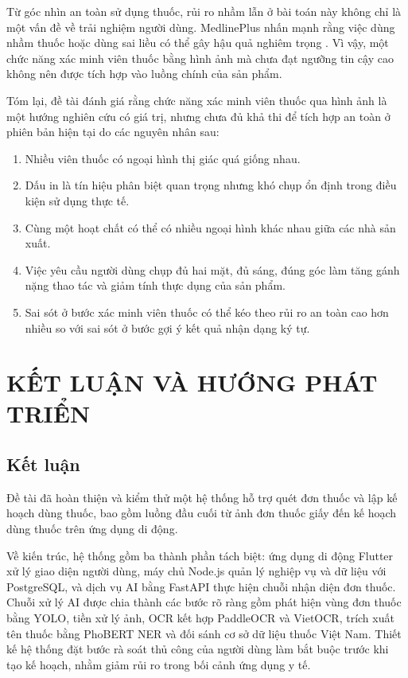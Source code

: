 \documentclass[12pt,a4paper]{report}
\begin{document}
Từ góc nhìn an toàn sử dụng thuốc, rủi ro nhầm lẫn ở bài toán này không chỉ là một vấn đề về trải nghiệm người dùng. MedlinePlus nhấn mạnh rằng việc dùng nhầm thuốc hoặc dùng sai liều có thể gây hậu quả nghiêm trọng \cite{medlineplus-safety}. Vì vậy, một chức năng xác minh viên thuốc bằng hình ảnh mà chưa đạt ngưỡng tin cậy cao không nên được tích hợp vào luồng chính của sản phẩm.

Tóm lại, đề tài đánh giá rằng chức năng xác minh viên thuốc qua hình ảnh là một hướng nghiên cứu có giá trị, nhưng chưa đủ khả thi để tích hợp an toàn ở phiên bản hiện tại do các nguyên nhân sau:

\begin{enumerate}[label=\arabic*.]
    \item Nhiều viên thuốc có ngoại hình thị giác quá giống nhau.
    \item Dấu in là tín hiệu phân biệt quan trọng nhưng khó chụp ổn định trong điều kiện sử dụng thực tế.
    \item Cùng một hoạt chất có thể có nhiều ngoại hình khác nhau giữa các nhà sản xuất.
    \item Việc yêu cầu người dùng chụp đủ hai mặt, đủ sáng, đúng góc làm tăng gánh nặng thao tác và giảm tính thực dụng của sản phẩm.
    \item Sai sót ở bước xác minh viên thuốc có thể kéo theo rủi ro an toàn cao hơn nhiều so với sai sót ở bước gợi ý kết quả nhận dạng ký tự.
\end{enumerate}

\chapter{KẾT LUẬN VÀ HƯỚNG PHÁT TRIỂN}

\section{Kết luận}

Đề tài đã hoàn thiện và kiểm thử một hệ thống hỗ trợ quét đơn thuốc và lập kế hoạch dùng thuốc, bao gồm luồng đầu cuối từ ảnh đơn thuốc giấy đến kế hoạch dùng thuốc trên ứng dụng di động.

Về kiến trúc, hệ thống gồm ba thành phần tách biệt: ứng dụng di động Flutter xử lý giao diện người dùng, máy chủ Node.js quản lý nghiệp vụ và dữ liệu với PostgreSQL, và dịch vụ AI bằng FastAPI thực hiện chuỗi nhận diện đơn thuốc. Chuỗi xử lý AI được chia thành các bước rõ ràng gồm phát hiện vùng đơn thuốc bằng YOLO, tiền xử lý ảnh, OCR kết hợp PaddleOCR và VietOCR, trích xuất tên thuốc bằng PhoBERT NER và đối sánh cơ sở dữ liệu thuốc Việt Nam. Thiết kế hệ thống đặt bước rà soát thủ công của người dùng làm bắt buộc trước khi tạo kế hoạch, nhằm giảm rủi ro trong bối cảnh ứng dụng y tế.
\end{document}
